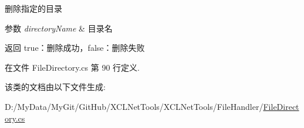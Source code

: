 删除指定的目录 


\begin{DoxyParams}{参数}
{\em directory\-Name} & 目录名\\
\hline
\end{DoxyParams}
\begin{DoxyReturn}{返回}
true：删除成功，false：删除失败
\end{DoxyReturn}


在文件 File\-Directory.\-cs 第 90 行定义.



该类的文档由以下文件生成\-:\begin{DoxyCompactItemize}
\item 
D\-:/\-My\-Data/\-My\-Git/\-Git\-Hub/\-X\-C\-L\-Net\-Tools/\-X\-C\-L\-Net\-Tools/\-File\-Handler/\hyperlink{_file_directory_8cs}{File\-Directory.\-cs}\end{DoxyCompactItemize}

